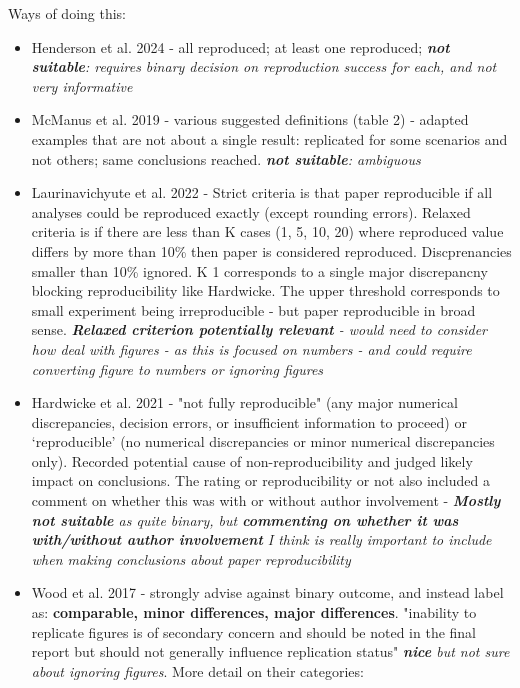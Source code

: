 Ways of doing this:
\begin{itemize}
    \item Henderson et al. 2024 - all reproduced; at least one reproduced;\autocite{henderson_reproducibility_2024} \textit{\textbf{not suitable}: requires binary decision on reproduction success for each, and not very informative}
    \item McManus et al. 2019 - various suggested definitions (table 2) - adapted examples that are not about a single result:  replicated for some scenarios and not others; same conclusions reached.\autocite{mcmanus_can_2019} \textit{\textbf{not suitable}: ambiguous}
    \item Laurinavichyute et al. 2022 - Strict criteria is that paper reproducible if all analyses could be reproduced exactly (except rounding errors). Relaxed criteria is if there are less than K cases (1, 5, 10, 20) where reproduced value differs by more than 10\% then paper is considered reproduced. Discprenancies smaller than 10\% ignored. K 1 corresponds to a single major discrepancny blocking reproducibility like Hardwicke. The upper threshold corresponds to small experiment being irreproducible - but paper reproducible in broad sense. \autocite{laurinavichyute_share_2022} \textit{\textbf{Relaxed criterion potentially relevant} - would need to consider how deal with figures - as this is focused on numbers - and could require converting figure to numbers or ignoring figures}
    \item Hardwicke et al. 2021 - "not fully reproducible"  (any major numerical discrepancies, decision errors, or insufficient information to proceed) or ‘reproducible’ (no numerical discrepancies or minor numerical discrepancies only). Recorded potential cause of non-reproducibility and judged likely impact on conclusions. The rating or reproducibility or not also included a comment on whether this was with or without author involvement\autocite{hardwicke_analytic_2021, hardwicke_pre-registered_2017} - \textit{\textbf{Mostly not suitable} as quite binary, but \textbf{commenting on whether it was with/without author involvement} I think is really important to include when making conclusions about paper reproducibility}
    \item Wood et al. 2017 - strongly advise against binary outcome, and instead label as: \textbf{comparable, minor differences, major differences}. "inability to replicate figures is of secondary concern and should be noted in the final report but should not generally influence replication status" \autocite{wood_push_2018, wood_replication_2018} \textit{\textbf{nice} but not sure about ignoring figures}. More detail on their categories:

\end{itemize}
